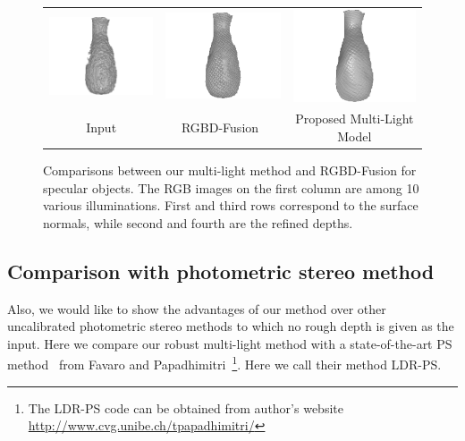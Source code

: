 \begin{figure}[!ht]
{\begin{tabular}{c|c c}
   \includegraphics[height = 0.24\linewidth]{figures/result/robust_vase_shape_init.pdf} 
   &
   \includegraphics[height = 0.24\linewidth]{figures/result/rgbd_vase_shape.pdf} &
   \includegraphics[height = 0.24\linewidth]{figures/result/robust_vase_shape.pdf}\\


   {Input} & {RGBD-Fusion~\cite{or2015rgbd}} & {Proposed Multi-Light Model}               
 \end{tabular}}
\caption{Comparisons between our multi-light method and RGBD-Fusion for specular objects. The RGB images on the first column are among 10 various illuminations. First and third rows correspond to the surface normals, while second and fourth are the refined depths.}
\label{fig:comp_specular}
\end{figure}

\subsection{Comparison with photometric stereo method}
Also, we would like to show the advantages of our method over other uncalibrated photometric stereo methods to which no rough depth is given as the input.
Here we compare our robust multi-light method with a state-of-the-art PS method~\cite{favaro2012closed} from Favaro and Papadhimitri~\footnote{The LDR-PS code can be obtained from author's website \url{http://www.cvg.unibe.ch/tpapadhimitri/}}. 
Here we call their method LDR-PS.

